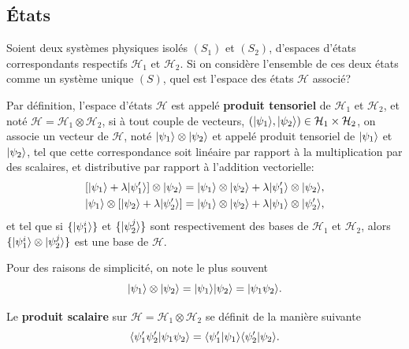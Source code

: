 \subsection{États}

Soient deux systèmes physiques isolés $(S_{1})$ et $(S_{2})$, d'espaces d'états
correspondants respectifs $\mathcal{H}_{1}$ et $\mathcal{H}_{2}$. Si on
considère l'ensemble de ces deux états comme un système unique $(S)$, quel est
l'espace des états $\mathcal{H}$ associé?

\colorbox[gray]{0.8}{
\parbox[c]{0.9\textwidth}{
\begin{definition}
Par définition, l'espace d'états $\mathcal{H}$ est appelé \textbf{produit
tensoriel} de $\mathcal{H}_{1}$ et $\mathcal{H}_{2}$, et noté $\mathcal{H}%
=\mathcal{H}_{1}\otimes\mathcal{H}_{2}$, si à tout couple de vecteurs,
$(\vert\psi_{1}\rangle,\vert\psi_{2}\rangle)\in\mathcal{H}_{1}\times\mathcal{H}_{2}$, on
associe un vecteur de $\mathcal{H}$, noté $\vert\psi_{1}\rangle\otimes\vert\psi_{2}\rangle$
et appelé produit tensoriel de $\vert\psi_{1}\rangle$ et $\vert\psi_{2}\rangle$, tel que
cette correspondance soit linéaire par rapport à la multiplication par des
scalaires, et distributive par rapport à l'addition vectorielle:
\begin{subequations}%
\begin{align}
[\vert\psi_{1}\rangle+\lambda\vert\psi_{1}^{\prime}\rangle]\otimes\vert\psi_{2}\rangle &
=\vert\psi_{1}\rangle\otimes\vert\psi_{2}\rangle+\lambda\vert\psi_{1}^{\prime}\rangle\otimes
\vert\psi_{2}\rangle,\\
\vert\psi_{1}\rangle\otimes[\vert\psi_{2}\rangle+\lambda\vert\psi_{2}^{\prime}\rangle]   &
=\vert\psi_{1}\rangle\otimes\vert\psi_{2}\rangle+\lambda\vert\psi_{1}\rangle\otimes\vert\psi_{2}^{
\prime}\rangle,
\end{align}
\end{subequations}%
et tel que si $\{\vert\psi_{1}^{i}\rangle\}$ et $\{\vert\psi_{2}^{j}\rangle\}$ sont
respectivement des bases de $\mathcal{H}_{1}$ et $\mathcal{H}_{2}$, alors
$\{\vert\psi_{1}^{i}\rangle\otimes\vert\psi_{2}^{j}\rangle\}$ est une base de
$\mathcal{H}$.
\end{definition}
}}
\medskip

Pour des raisons de simplicité, on note le plus souvent
\begin{equation}
\vert\psi_{1}\rangle\otimes\vert\psi_{2}\rangle=\vert\psi_{1}\rangle\vert\psi_{2}\rangle
=\vert\psi_{1}\psi_{2}\rangle.
\end{equation}

\colorbox[gray]{0.8}{
\parbox[c]{0.9\textwidth}{
\begin{definition}
Le \textbf{produit scalaire} sur $\mathcal{H}=\mathcal{H}_{1}\otimes
\mathcal{H}_{2}$ se définit de la manière suivante%
\begin{equation}
\langle\psi_{1}^{\prime}\psi_{2}^{\prime}\vert\psi_{1}\psi_{2}\rangle=
\langle\psi_{1}^{\prime}\vert\psi_{1}\rangle
\langle\psi_{2}^{\prime}\vert\psi_{2}\rangle.
\end{equation}
\end{definition}
}}
\medskip

